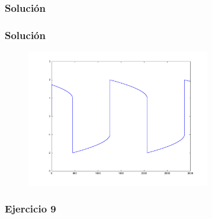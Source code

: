 \documentclass[12pt]{beamer}
\begin{document}
\begin{large}
\begin{frame}\frametitle{Solución}
\testcode
\end{frame}


\begin{frame}
  \frametitle{Solución}
  \begin{figure}[h]
    \centering{}
    \includegraphics[width=8cm, keepaspectratio]{fig/vdp1000.pdf}
  \end{figure}
\end{frame}

\begin{frame}
  \frametitle{Ejercicio 9}
\end{frame}

\end{large}
\end{document}
